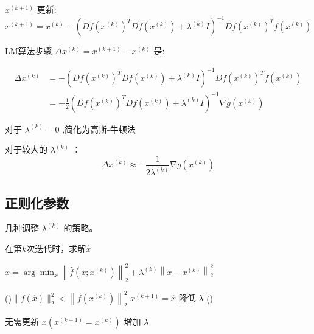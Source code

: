 $ x^{(k+1)} $ 更新:
\begin{equation}
x^{(k+1)}=x^{(k)}-\left(D f\left(x^{(k)}\right)^{T} D f\left(x^{(k)}\right)+\lambda^{(k)} I\right)^{-1} D f\left(x^{(k)}\right)^{T} f\left(x^{(k)}\right)
\end{equation}

\begin{theorem}
    LM算法步骤 $ \Delta x^{(k)}=x^{(k+1)}-x^{(k)} $ 是:

\begin{equation} \begin{aligned} \Delta x^{(k)} &=-\left(D f\left(x^{(k)}\right)^{T} D f\left(x^{(k)}\right)+\lambda^{(k)} I\right)^{-1} D f\left(x^{(k)}\right)^{T} f\left(x^{(k)}\right) \\ &=-\frac{1}{2}\left(D f\left(x^{(k)}\right)^{T} D f\left(x^{(k)}\right)+\lambda^{(k)} I\right)^{-1} \nabla g\left(x^{(k)}\right) \end{aligned} \end{equation}
\end{theorem}

\begin{theorem}
    对于 $ \lambda^{(k)}=0 $ ,简化为高斯-牛顿法
\end{theorem}

\begin{theorem}
    对于较大的 $ \lambda^{(k)} $ ：
\begin{equation}
\Delta x^{(k)} \approx-\frac{1}{2 \lambda^{(k)}} \nabla g\left(x^{(k)}\right)
\end{equation}
\end{theorem}



\subsection{正则化参数}

几种调整 $ \lambda^{(k)} $ 的策略。

\begin{algorithm}[htbp]
    \caption{在第$k$次迭代时，求解$\hat{x}$}
    $
    \hat{x}=\arg \min _{x}\left\|\hat{f}\left(x ; x^{(k)}\right)\right\|_{2}^{2}+\lambda^{(k)}\left\|x-x^{(k)}\right\|_{2}^{2}
    $\;
    

    \If(){$ \|f(\hat{x})\|_{2}^{2}<\left\|f\left(x^{(k)}\right)\right\|_{2}^{2} $}{
        $ x^{(k+1)}=\hat{x} $\;
        降低 $ \lambda $
    }
    \Else(){
        无需更新 $ x \left(x^{(k+1)}=x^{(k)}\right) $\;
        增加 $ \lambda $\;

    }
\end{algorithm}

